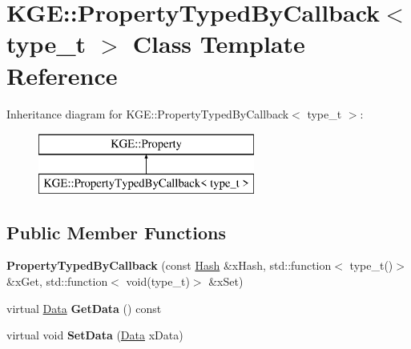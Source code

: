\hypertarget{class_k_g_e_1_1_property_typed_by_callback}{\section{K\-G\-E\-:\-:Property\-Typed\-By\-Callback$<$ type\-\_\-t $>$ Class Template Reference}
\label{class_k_g_e_1_1_property_typed_by_callback}
}
Inheritance diagram for K\-G\-E\-:\-:Property\-Typed\-By\-Callback$<$ type\-\_\-t $>$\-:\begin{figure}[H]
\begin{center}
\leavevmode
\includegraphics[height=2.000000cm]{class_k_g_e_1_1_property_typed_by_callback}
\end{center}
\end{figure}
\subsection*{Public Member Functions}
\begin{DoxyCompactItemize}
\item 
\hypertarget{class_k_g_e_1_1_property_typed_by_callback_aaf008232c13190a840d5f98919a1b36c}{{\bfseries Property\-Typed\-By\-Callback} (const \hyperlink{class_k_g_e_1_1_hash}{Hash} \&x\-Hash, std\-::function$<$ type\-\_\-t()$>$ \&x\-Get, std\-::function$<$ void(type\-\_\-t)$>$ \&x\-Set)}\label{class_k_g_e_1_1_property_typed_by_callback_aaf008232c13190a840d5f98919a1b36c}

\item 
\hypertarget{class_k_g_e_1_1_property_typed_by_callback_a1378c69b5eea301fa244bcf270a25301}{virtual \hyperlink{class_k_g_e_1_1_data}{Data} {\bfseries Get\-Data} () const }\label{class_k_g_e_1_1_property_typed_by_callback_a1378c69b5eea301fa244bcf270a25301}

\item 
\hypertarget{class_k_g_e_1_1_property_typed_by_callback_a089fcc45a9b1f44ccac1fd57a952edbb}{virtual void {\bfseries Set\-Data} (\hyperlink{class_k_g_e_1_1_data}{Data} x\-Data)}\label{class_k_g_e_1_1_property_typed_by_callback_a089fcc45a9b1f44ccac1fd57a952edbb}

\end{DoxyCompactItemize}
